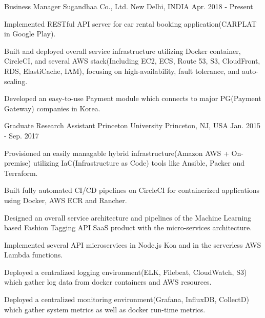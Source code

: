 
\begin{cventries}

  \cventry
    {Business Manager} %
    {Sugandhaa Co., Ltd.} %
    {New Delhi, INDIA} %
    {Apr. 2018 - Present} %
    {
      \begin{cvitems} %
        \item {Implemented RESTful API server for car rental booking application(CARPLAT in Google Play).}
        \item {Built and deployed overall service infrastructure utilizing Docker container, CircleCI, and several AWS stack(Including EC2, ECS, Route 53, S3, CloudFront, RDS, ElastiCache, IAM), focusing on high-availability, fault tolerance, and auto-scaling.}
        \item {Developed an easy-to-use Payment module which connects to major PG(Payment Gateway) companies in Korea.}
      \end{cvitems}
    }

  \cventry
    {Graduate Research Assistant} %
    {Princeton University} %
    {Princeton, NJ, USA} %
    {Jan. 2015 - Sep. 2017} %
    {
      \begin{cvitems} %
        \item {Provisioned an easily managable hybrid infrastructure(Amazon AWS + On-premise) utilizing IaC(Infrastructure as Code) tools like Ansible, Packer and Terraform.}
        \item {Built fully automated CI/CD pipelines on CircleCI for containerized applications using Docker, AWS ECR and Rancher.}
        \item {Designed an overall service architecture and pipelines of the Machine Learning based Fashion Tagging API SaaS product with the micro-services architecture.}
        \item {Implemented several API microservices in Node.js Koa and in the serverless AWS Lambda functions.}
        \item {Deployed a centralized logging environment(ELK, Filebeat, CloudWatch, S3) which gather log data from docker containers and AWS resources.}
        \item {Deployed a centralized monitoring environment(Grafana, InfluxDB, CollectD) which gather system metrics as well as docker run-time metrics.}
      \end{cvitems}
    }


\end{cventries}
